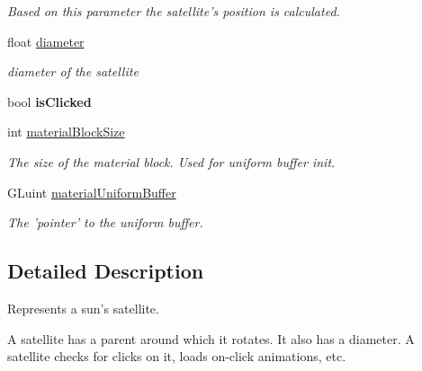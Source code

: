 \begin{DoxyCompactItemize}
\begin{DoxyCompactList}\small\item\em Based on this parameter the satellite's position is calculated. \end{DoxyCompactList}\item 
\hypertarget{class_satellite_a24fb12be82187b2009947c4c02f732eb}{float \hyperlink{class_satellite_a24fb12be82187b2009947c4c02f732eb}{diameter}}\label{class_satellite_a24fb12be82187b2009947c4c02f732eb}

\begin{DoxyCompactList}\small\item\em {\itshape diameter} of the satellite \end{DoxyCompactList}\item 
\hypertarget{class_satellite_addd9824588521e5d6a17bd4a9a9618cf}{bool {\bfseries is\-Clicked}}\label{class_satellite_addd9824588521e5d6a17bd4a9a9618cf}

\item 
\hypertarget{class_satellite_a32c179c36f0dfdbdb0317b123087ace2}{int \hyperlink{class_satellite_a32c179c36f0dfdbdb0317b123087ace2}{material\-Block\-Size}}\label{class_satellite_a32c179c36f0dfdbdb0317b123087ace2}

\begin{DoxyCompactList}\small\item\em The size of the material block. Used for uniform buffer init. \end{DoxyCompactList}\item 
\hypertarget{class_satellite_a8d2a1b2c79145f4ea10937c9f9f6e5f1}{G\-Luint \hyperlink{class_satellite_a8d2a1b2c79145f4ea10937c9f9f6e5f1}{material\-Uniform\-Buffer}}\label{class_satellite_a8d2a1b2c79145f4ea10937c9f9f6e5f1}

\begin{DoxyCompactList}\small\item\em The 'pointer' to the uniform buffer. \end{DoxyCompactList}\end{DoxyCompactItemize}


\subsection{Detailed Description}
Represents a sun's satellite. 

A satellite has a parent around which it rotates. It also has a diameter. A satellite checks for clicks on it, loads on-\/click animations, etc. 

